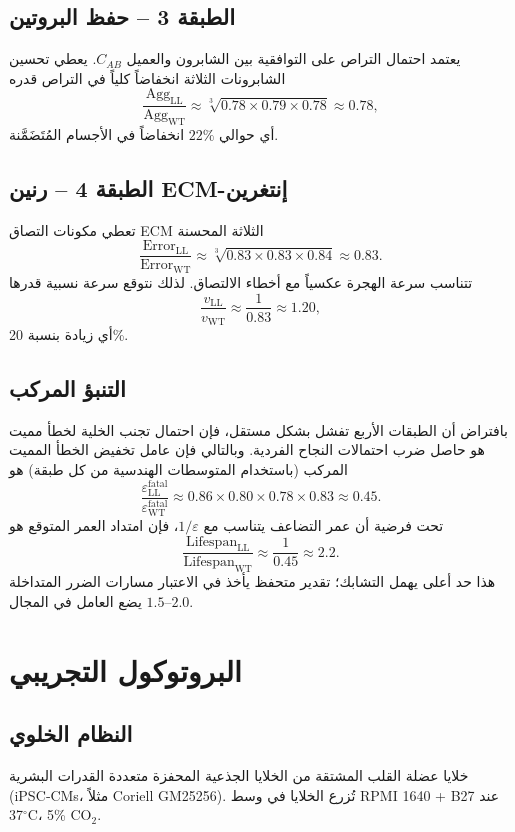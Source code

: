 \documentclass[11pt,a4paper]{article}
\begin{document}
	\subsection{الطبقة 3 – حفظ البروتين}
	يعتمد احتمال التراص على التوافقية بين الشابرون والعميل \(C_{AB}\). يعطي تحسين الشابرونات الثلاثة انخفاضاً كلياً في التراص قدره
	\[
	\frac{\mathrm{Agg}_{\mathrm{LL}}}{\mathrm{Agg}_{\mathrm{WT}}} \approx \sqrt[3]{0.78 \times 0.79 \times 0.78} \approx 0.78,
	\]
	أي حوالي \(22\%\) انخفاضاً في الأجسام المُتَضَمَّنة.
	
	\subsection{الطبقة 4 – رنين ECM-إنتغرين}
	تعطي مكونات التصاق ECM الثلاثة المحسنة
	\[
	\frac{\mathrm{Error}_{\mathrm{LL}}}{\mathrm{Error}_{\mathrm{WT}}} \approx \sqrt[3]{0.83 \times 0.83 \times 0.84} \approx 0.83.
	\]
	تتناسب سرعة الهجرة عكسياً مع أخطاء الالتصاق. لذلك نتوقع سرعة نسبية قدرها
	\[
	\frac{v_{\mathrm{LL}}}{v_{\mathrm{WT}}} \approx \frac{1}{0.83} \approx 1.20,
	\]
	أي زيادة بنسبة 20\%.
	
	\subsection{التنبؤ المركب}
	بافتراض أن الطبقات الأربع تفشل بشكل مستقل، فإن احتمال تجنب الخلية لخطأ مميت هو حاصل ضرب احتمالات النجاح الفردية. وبالتالي فإن عامل تخفيض الخطأ المميت المركب (باستخدام المتوسطات الهندسية من كل طبقة) هو
	\[
	\frac{\varepsilon_{\mathrm{LL}}^{\mathrm{fatal}}}{\varepsilon_{\mathrm{WT}}^{\mathrm{fatal}}} \approx 0.86 \times 0.80 \times 0.78 \times 0.83 \approx 0.45.
	\]
	تحت فرضية أن عمر التضاعف يتناسب مع \(1/\varepsilon\)، فإن امتداد العمر المتوقع هو
	\[
	\frac{\mathrm{Lifespan}_{\mathrm{LL}}}{\mathrm{Lifespan}_{\mathrm{WT}}} \approx \frac{1}{0.45} \approx 2.2.
	\]
	هذا حد أعلى يهمل التشابك؛ تقدير متحفظ يأخذ في الاعتبار مسارات الضرر المتداخلة يضع العامل في المجال \(1.5\)–\(2.0\).
	
	\section{البروتوكول التجريبي}
	\label{sec:protocol}
	
	\subsection{النظام الخلوي}
	خلايا عضلة القلب المشتقة من الخلايا الجذعية المحفزة متعددة القدرات البشرية (iPSC‑CMs، مثلاً Coriell GM25256). تُزرع الخلايا في وسط RPMI 1640 + B27 عند 37\(^\circ\)C، 5\% CO\(_2\).
	
\end{document}
